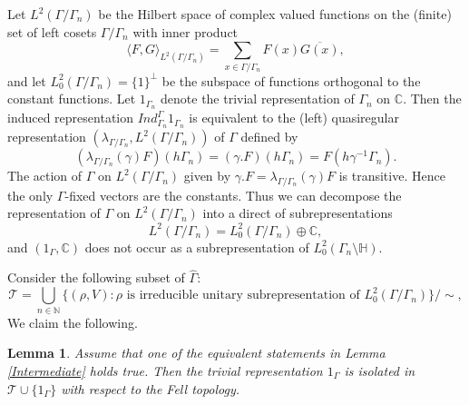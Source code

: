 \documentclass[12pt]{article}
\newtheorem{lem}[thm]{Lemma}
\newcommand{\CC}{\mathbb{C}}
\newcommand{\HH}{\mathbb{H}}
\begin{document}
Let $ L^{2}(\Gamma/\Gamma_{n}) $ be the Hilbert space of complex valued functions on the (finite) set of left cosets $ \Gamma/\Gamma_{n} $ with inner product
$$ \langle F,G \rangle_{L^{2}(\Gamma/\Gamma_{n})} = \sum_{x\in \Gamma/\Gamma_{n}} F(x) \overline{G(x)}, $$
and let $ L_{0}^{2}(\Gamma/\Gamma_{n}) = \{ 1 \}^{\perp} $ be the subspace of functions orthogonal to the constant functions. Let $ 1_{\Gamma_{n}} $ denote the trivial representation of $ \Gamma_{n} $ on $ \CC $. Then the induced representation $ Ind_{\Gamma_{n}}^{\Gamma} 1_{\Gamma_{n}} $ is equivalent to the (left) quasiregular representation $ (\lambda_{\Gamma/\Gamma_{n}}, L^{2}(\Gamma/\Gamma_{n})) $ of $ \Gamma $  defined by 
$$ (\lambda_{\Gamma/\Gamma_{n}}(\gamma)F)(h\Gamma_{n} ) = (\gamma.F)(h\Gamma_{n})  = F(h\gamma^{-1} \Gamma_{n}). $$
The action of $ \Gamma $ on $ L^{2}(\Gamma/\Gamma_{n}) $ given by $ \gamma.F = \lambda_{\Gamma/\Gamma_{n}}(\gamma)F $ is transitive. Hence the only $ \Gamma $-fixed vectors are the constants. Thus we can decompose the representation of $ \Gamma $ on $ L^{2}(\Gamma/\Gamma_{n}) $ into a direct of subrepresentations 
$$ L^{2}(\Gamma/\Gamma_{n}) = L_{0}^{2}(\Gamma/\Gamma_{n}) \oplus \CC, $$
and $ (1_{\Gamma}, \CC) $ does not occur as a subrepresentation of $ L_{0}^{2}(\Gamma_{n}\setminus \HH). $


Consider the following subset of $ \hat{\Gamma} $:
$$ \mathcal{T} = \bigcup_{n\in \mathbb{N}} \{ (\rho, V) : \rho \text{ is irreducible unitary subrepresentation of } L^{2}_{0}(\Gamma/\Gamma_{n}) \} / \sim, $$
We claim the following.

\begin{lem}\label{before expanders}
Assume that one of the equivalent statements in Lemma \ref{Intermediate} holds true. Then the trivial representation $ 1_{\Gamma} $ is isolated in $ \mathcal{T} \cup \{ 1_{\Gamma} \} $ with respect to the Fell topology.
\end{lem}
\end{document}
